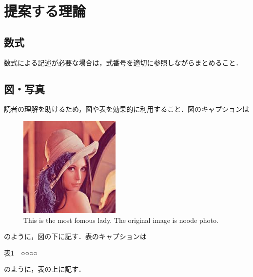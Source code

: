 \section{提案する理論}

\subsection{数式}

数式による記述が必要な場合は，式番号を適切に参照しながらまとめること．

\subsection{図・写真}

読者の理解を助けるため，図や表を効果的に利用すること．図のキャプションは

\begin{figure}
    \centering
    \includegraphics[width=5cm]{figures/Lena.png}
    \caption{This is the most fomous lady. The original image is noode photo.}
\end{figure}

のように，図の下に記す．表のキャプションは

\begin{center}表1　○○○○\end{center}

のように，表の上に記す．